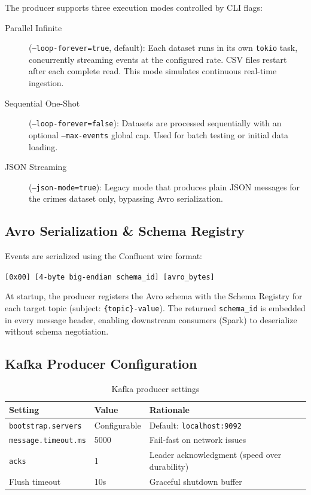 \documentclass[12pt,a4paper]{article}
\begin{document}
The producer supports three execution modes controlled by CLI flags:

\begin{description}
  \item[Parallel Infinite] (\texttt{--loop-forever=true}, default): Each dataset runs in its own \texttt{tokio} task, concurrently streaming events at the configured rate. CSV files restart after each complete read. This mode simulates continuous real-time ingestion.
  \item[Sequential One-Shot] (\texttt{--loop-forever=false}): Datasets are processed sequentially with an optional \texttt{--max-events} global cap. Used for batch testing or initial data loading.
  \item[JSON Streaming] (\texttt{--json-mode=true}): Legacy mode that produces plain JSON messages for the crimes dataset only, bypassing Avro serialization.
\end{description}

\subsection{Avro Serialization \& Schema Registry}

Events are serialized using the Confluent wire format:

\begin{center}
\texttt{[0x00] [4-byte big-endian schema\_id] [avro\_bytes]}
\end{center}

At startup, the producer registers the Avro schema with the Schema Registry for each target topic (subject: \texttt{\{topic\}-value}). The returned \texttt{schema\_id} is embedded in every message header, enabling downstream consumers (Spark) to deserialize without schema negotiation.

\subsection{Kafka Producer Configuration}

\begin{table}[H]
\centering
\caption{Kafka producer settings}
\begin{tabular}{l l l}
\toprule
\textbf{Setting} & \textbf{Value} & \textbf{Rationale} \\
\midrule
\texttt{bootstrap.servers} & Configurable & Default: \texttt{localhost:9092} \\
\texttt{message.timeout.ms} & 5000 & Fail-fast on network issues \\
\texttt{acks} & 1 & Leader acknowledgment (speed over durability) \\
Flush timeout & 10s & Graceful shutdown buffer \\
\bottomrule
\end{tabular}
\end{table}
\end{document}
